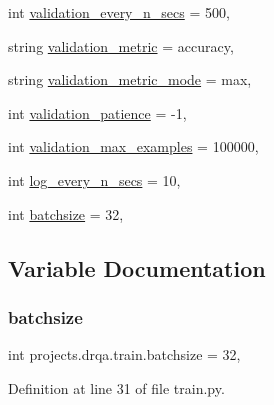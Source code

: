 \begin{DoxyCompactItemize}
\item 
int \hyperlink{namespaceprojects_1_1drqa_1_1train_adfd5cdc33c839b56aeff1dfc7c8dd9e3}{validation\+\_\+every\+\_\+n\+\_\+secs} = 500,
\item 
string \hyperlink{namespaceprojects_1_1drqa_1_1train_aa1d8003ed1a74f4241743e5c196d1ef0}{validation\+\_\+metric} = \textquotesingle{}accuracy\textquotesingle{},
\item 
string \hyperlink{namespaceprojects_1_1drqa_1_1train_a61221e01d346b90eae68f83f116eee54}{validation\+\_\+metric\+\_\+mode} = \textquotesingle{}max\textquotesingle{},
\item 
int \hyperlink{namespaceprojects_1_1drqa_1_1train_ab082d2bfffd3d5813ddd9738473dc9d8}{validation\+\_\+patience} = -\/1,
\item 
int \hyperlink{namespaceprojects_1_1drqa_1_1train_a6a1f59954753173dc0f39ab5696c35bf}{validation\+\_\+max\+\_\+examples} = 100000,
\item 
int \hyperlink{namespaceprojects_1_1drqa_1_1train_aff7109632eb80352261bcc25793579d5}{log\+\_\+every\+\_\+n\+\_\+secs} = 10,
\item 
int \hyperlink{namespaceprojects_1_1drqa_1_1train_a81c358599f939708b305c6484a374a98}{batchsize} = 32,
\end{DoxyCompactItemize}


\subsection{Variable Documentation}
\mbox{\label{namespaceprojects_1_1drqa_1_1train_a81c358599f939708b305c6484a374a98}} 
\subsubsection{\texorpdfstring{batchsize}{batchsize}}
{\footnotesize\ttfamily int projects.\+drqa.\+train.\+batchsize = 32,}



Definition at line 31 of file train.\+py.

\mbox{\label{namespaceprojects_1_1drqa_1_1train_a6f59838fa577eadc3abd789bd504912b}} 
